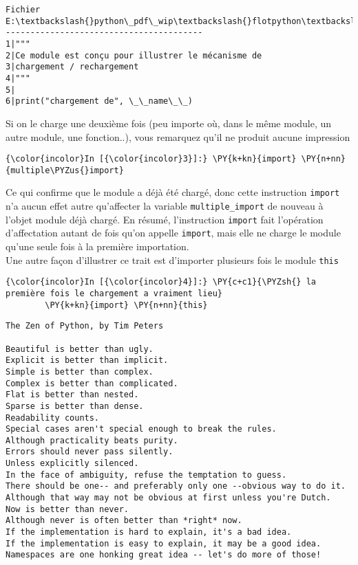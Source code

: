     \begin{Verbatim}[commandchars=\\\{\}]
Fichier E:\textbackslash{}python\_pdf\_wip\textbackslash{}flotpython\textbackslash{}w5\textbackslash{}multiple\_import.py
----------------------------------------
1|"""
2|Ce module est conçu pour illustrer le mécanisme de
3|chargement / rechargement 
4|"""
5|
6|print("chargement de", \_\_name\_\_)

    \end{Verbatim}

    Si on le charge une deuxième fois (peu importe où, dans le même module,
un autre module, une fonction..), vous remarquez qu'il ne produit aucune
impression

    \begin{Verbatim}[commandchars=\\\{\}]
{\color{incolor}In [{\color{incolor}3}]:} \PY{k+kn}{import} \PY{n+nn}{multiple\PYZus{}import} 
\end{Verbatim}


    Ce qui confirme que le module a déjà été chargé, donc cette instruction
\texttt{import} n'a aucun effet autre qu'affecter la variable
\texttt{multiple\_import} de nouveau à l'objet module déjà chargé. En
résumé, l'instruction \texttt{import} fait l'opération d'affectation
autant de fois qu'on appelle \texttt{import}, mais elle ne charge le
module qu'une seule fois à la première importation.\\

    Une autre façon d'illustrer ce trait est d'importer plusieurs fois le
module \texttt{this}

    \begin{Verbatim}[commandchars=\\\{\}]
{\color{incolor}In [{\color{incolor}4}]:} \PY{c+c1}{\PYZsh{} la première fois le chargement a vraiment lieu}
        \PY{k+kn}{import} \PY{n+nn}{this}
\end{Verbatim}


    \begin{Verbatim}[commandchars=\\\{\}]
The Zen of Python, by Tim Peters

Beautiful is better than ugly.
Explicit is better than implicit.
Simple is better than complex.
Complex is better than complicated.
Flat is better than nested.
Sparse is better than dense.
Readability counts.
Special cases aren't special enough to break the rules.
Although practicality beats purity.
Errors should never pass silently.
Unless explicitly silenced.
In the face of ambiguity, refuse the temptation to guess.
There should be one-- and preferably only one --obvious way to do it.
Although that way may not be obvious at first unless you're Dutch.
Now is better than never.
Although never is often better than *right* now.
If the implementation is hard to explain, it's a bad idea.
If the implementation is easy to explain, it may be a good idea.
Namespaces are one honking great idea -- let's do more of those!

    \end{Verbatim}

